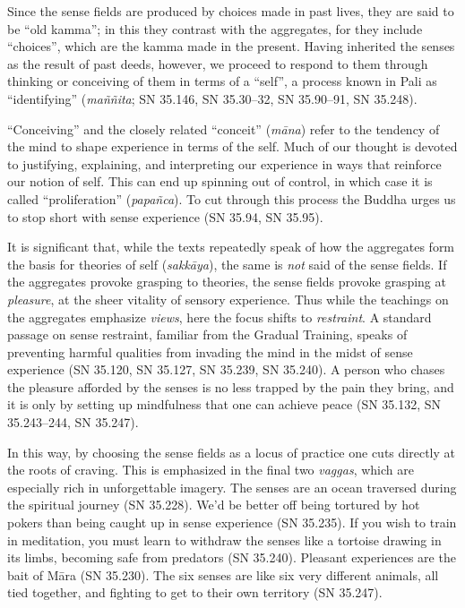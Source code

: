 \documentclass[12pt,openany]{book}%
\begin{document}
Since the sense fields are produced by choices made in past lives, they are said to be “old kamma”; in this they contrast with the aggregates, for they include “choices”, which are the kamma made in the present. Having inherited the senses as the result of past deeds, however, we proceed to respond to them through thinking or conceiving of them in terms of a “self”, a process known in Pali as “identifying” (\textit{\textsanskrit{maññita}}; SN 35.146, SN 35.30–32, SN 35.90–91, SN 35.248).

“Conceiving” and the closely related “conceit” (\textit{\textsanskrit{māna}}) refer to the tendency of the mind to shape experience in terms of the self. Much of our thought is devoted to justifying, explaining, and interpreting our experience in ways that reinforce our notion of self. This can end up spinning out of control, in which case it is called “proliferation” (\textit{\textsanskrit{papañca}}). To cut through this process the Buddha urges us to stop short with sense experience (SN 35.94, SN 35.95).

It is significant that, while the texts repeatedly speak of how the aggregates form the basis for theories of self (\textit{\textsanskrit{sakkāya}}), the same is \emph{not} said of the sense fields. If the aggregates provoke grasping to theories, the sense fields provoke grasping at \emph{pleasure}, at the sheer vitality of sensory experience. Thus while the teachings on the aggregates emphasize \emph{views}, here the focus shifts to \emph{restraint}. A standard passage on sense restraint, familiar from the Gradual Training, speaks of preventing harmful qualities from invading the mind in the midst of sense experience (SN 35.120, SN 35.127, SN 35.239, SN 35.240). A person who chases the pleasure afforded by the senses is no less trapped by the pain they bring, and it is only by setting up mindfulness that one can achieve peace (SN 35.132, SN 35.243–244, SN 35.247).

In this way, by choosing the sense fields as a locus of practice one cuts directly at the roots of craving. This is emphasized in the final two \textit{vaggas}, which are especially rich in unforgettable imagery. The senses are an ocean traversed during the spiritual journey (SN 35.228). We’d be better off being tortured by hot pokers than being caught up in sense experience (SN 35.235). If you wish to train in meditation, you must learn to withdraw the senses like a tortoise drawing in its limbs, becoming safe from predators (SN 35.240). Pleasant experiences are the bait of \textsanskrit{Māra} (SN 35.230). The six senses are like six very different animals, all tied together, and fighting to get to their own territory (SN 35.247).
\end{document}
